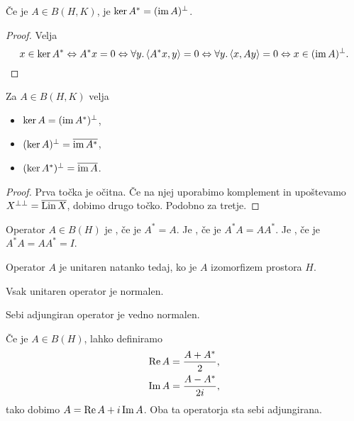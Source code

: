 \begin{trditev}
  Če je $A \in B(H,K)$, je $\operatorname{ker} A^* = (\operatorname{im} A)^\bot$.
\end{trditev}

\begin{proof}
  Velja
  \[
	x \in \operatorname{ker} A^*
	\Leftrightarrow A^* x = 0
	\Leftrightarrow \forall y. \left< A^* x, y \right> = 0
	\Leftrightarrow \forall y. \left< x, Ay \right> = 0
	\Leftrightarrow x \in (\operatorname{im} A)^\bot.
	\qedhere
  \]
\end{proof}

\begin{posledica}
  Za $A \in B(H,K)$ velja
  \begin{itemize}
  \item $\operatorname{ker} A = (\operatorname{im} A^*)^\bot$,
  \item $(\operatorname{ker} A)^\bot = \overline{\operatorname{im} A^*}$,
  \item $(\operatorname{ker} A^*)^\bot = \overline{\operatorname{im} A}$.
  \end{itemize}
\end{posledica}

\begin{proof}
  Prva točka je očitna.
  Če na njej uporabimo komplement in upoštevamo $X^{\bot \bot} =
  \overline{\operatorname{Lin} X}$, dobimo drugo točko.
  Podobno za tretje.
\end{proof}

\begin{definicija}
  Operator $A \in B(H)$ je , če je $A^* =A$.
  Je , če je $A^* A = A A^*$.
  Je , če je $A^* A = A A^* = I$.
\end{definicija}

\begin{opomba}
  Operator $A$ je unitaren natanko tedaj, ko je $A$ izomorfizem prostora $H$.
\end{opomba}

\begin{opomba}
  Vsak unitaren operator je normalen.
\end{opomba}

\begin{opomba}
  Sebi adjungiran operator je vedno normalen.
\end{opomba}

Če je $A \in B(H)$, lahko definiramo
\begin{gather*}
  \operatorname{Re} A = \frac{A+A^*}{2}, \\
  \operatorname{Im} A = \frac{A - A^*}{2i},
\end{gather*}
tako dobimo $A = \operatorname{Re} A + i \operatorname{Im} A$.
Oba ta operatorja sta sebi adjungirana.

